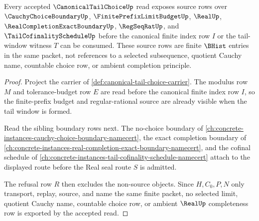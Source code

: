\begin{theorem}
\label{thm:canonical-tail-choice-source-obligations}
Every accepted $\CanonicalTailChoiceUp$ read exposes source rows over $\CauchyChoiceBoundaryUp$, $\FinitePrefixLimitBudgetUp$, $\RealUp$, $\RealCompletionExactBoundaryUp$, $\RegSeqRatUp$, and $\TailCofinalityScheduleUp$ before the canonical finite index row $I$ or the tail-window witness $T$ can be consumed. These source rows are finite $\BHist$ entries in the same packet, not references to a selected subsequence, quotient Cauchy name, countable choice row, or ambient completion principle.
\end{theorem}
\begin{proof}
Project the carrier of \autoref{def:canonical-tail-choice-carrier}. The modulus row $M$ and tolerance-budget row $E$ are read before the canonical finite index row $I$, so the finite-prefix budget and regular-rational source are already visible when the tail window is formed.

Read the sibling boundary rows next. The no-choice boundary of \autoref{ch:concrete-instances-cauchy-choice-boundary-namecert}, the exact completion boundary of \autoref{ch:concrete-instances-real-completion-exact-boundary-namecert}, and the cofinal schedule of \autoref{ch:concrete-instances-tail-cofinality-schedule-namecert} attach to the displayed route before the Real seal route $S$ is admitted.

The refusal row $R$ then excludes the non-source objects. Since $H,C_0,P,N$ only transport, replay, source, and name the same finite packet, no selected limit, quotient Cauchy name, countable choice row, or ambient $\RealUp$ completeness row is exported by the accepted read.
\end{proof}

